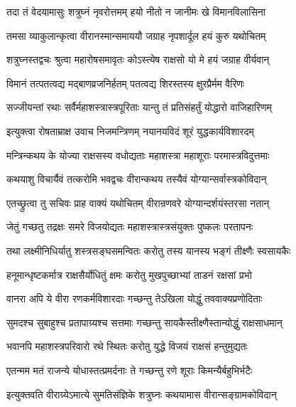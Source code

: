 \twolineshloka
{तदा तं वेदयामासुः शत्रुघ्नं नृवरोत्तमम्}
{हयो नीतो न जानीमः खे विमानविलासिना}%

\twolineshloka
{तमसा व्याकुलान्कृत्वा वीरानस्मान्समाययौ}
{जग्राह नृपशार्दूल हयं कुरु यथोचितम्}%

\twolineshloka
{शत्रुघ्नस्तद्वचः श्रुत्वा महारोषसमावृतः}
{कोऽस्त्येष राक्षसो यो मे हयं जग्राह वीर्यवान्}%

\twolineshloka
{विमानं तत्पतत्वद्य मद्बाणव्रजनिर्हतम्}
{पतत्वद्य शिरस्तस्य क्षुरप्रैर्मम वैरिणः}%

\twolineshloka
{सज्जीयन्तां रथाः सर्वैर्महाशस्त्रास्त्रपूरिताः}
{यान्तु तं प्रतिसंहर्तुं योद्धारो वाजिहारिणम्}%

\twolineshloka
{इत्युक्त्वा रोषताम्राक्ष उवाच निजमन्त्रिणम्}
{नयानयविदं शूरं युद्धकार्यविशारदम्}%


\twolineshloka
{मन्त्रिन्कथय के योज्या राक्षसस्य वधोद्यताः}
{महाशस्त्रा महाशूराः परमास्त्रविदुत्तमाः}%

\twolineshloka
{कथयाशु विचार्यैवं तत्करोमि भवद्वचः}
{वीरान्कथय तस्यैवं योग्यान्सर्वास्त्रकोविदान्}%

\twolineshloka
{एतच्छ्रुत्वा तु सचिवः प्राह वाक्यं यथोचितम्}
{वीरान्रणवरे योग्यान्दर्शयंस्तरसा नतान्}%


\twolineshloka
{जेतुं गच्छतु तद्रक्षः समरे विजयोद्यतः}
{महाशस्त्रास्त्रसंयुक्तः पुष्कलः परतापनः}%

\twolineshloka
{तथा लक्ष्मीनिधिर्यातु शस्त्रसङ्घसमन्वितः}
{करोतु तस्य यानस्य भङ्गं तीक्ष्णैः स्वसायकैः}%

\twolineshloka
{हनूमान्धृष्टकर्मात्र राक्षसैर्योधितुं क्षमः}
{करोतु मुखपुच्छाभ्यां ताडनं रक्षसां प्रभो}%

\twolineshloka
{वानरा अपि ये वीरा रणकर्मविशारदाः}
{गच्छन्तु तेऽखिला योद्धुं तववाक्यप्रणोदिताः}%

\twolineshloka
{सुमदश्च सुबाहुश्च प्रतापाग्र्यश्च सत्तमाः}
{गच्छन्तु सायकैस्तीक्ष्णैस्तान्योद्धुं राक्षसाधमान्}%

\twolineshloka
{भवानपि महाशस्त्रपरिवारो रथे स्थितः}
{करोतु युद्धे विजयं राक्षसं हन्तुमुद्यतः}%

\twolineshloka
{एतन्मम मतं राजन्ये योधास्तत्प्रमर्दनाः}
{ते गच्छन्तु रणे शूराः किमन्यैर्बहुभिर्भटैः}%

\twolineshloka
{इत्युक्तवति वीराग्र्येऽमात्ये सुमतिसंज्ञिके}
{शत्रुघ्नः कथयामास वीरान्सङ्ग्रामकोविदान्}%

